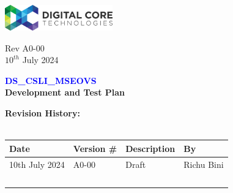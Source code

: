 \documentclass[a4paper,12pt]{article}
\begin{document}
	
	\begin{titlepage}
		\begin{flushleft} %
		\includegraphics[trim= 0cm 0cm 0cm 0.2cm, clip, width=0.35\textwidth]{dct-logo}\quad %
			\begin{minipage}[b]{0.6\textwidth} %
				\raggedleft %
				\normalsize %
				Rev A0-00 \quad \\
				$10^{th}$ July 2024 \
			\end{minipage}
		\end{flushleft}
		
		
		\vspace{6cm} %
		\begin{center} %
			\Huge %
			\textcolor{blue}{\textbf{DS\_CSLI\_MSEOVS}}\\
			\textbf{Development and Test Plan}
		\end{center}
		
	\end{titlepage}
	
	\newpage
	
	
	\textbf{Revision History:} \\
	\\
	\begin{tabular}{|l|l|l|l|}
		\hline
		Date & Version \# & Description & By \\
		\hline
		10th July 2024 & A0-00 & Draft & Richu Bini \\
		\hline
		& \  & \ & \  \\
		\hline
	\end{tabular}
	\newpage
	\tableofcontents
	\newpage
	\listoffigures
	\newpage
	
\end{document}
